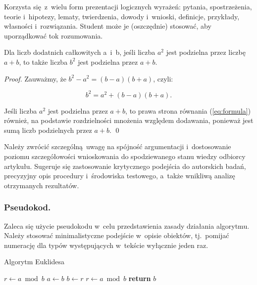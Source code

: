 Korzysta się z~wielu form prezentacji logicznych wyrażeń: pytania, spostrzeżenia, teorie i~hipotezy, lematy, twierdzenia, dowody i~wnioski, definicje, przykłady, własności i~rozwiązania. Student może je (oszczędnie) stosować, aby uporządkować tok rozumowania.

\begin{claim}
	Dla liczb dodatnich całkowitych a~i~b, jeśli liczba $a^{2}$ jest podzielna przez liczbę $a+b$, to także liczba $b^{2}$ jest podzielna przez $a+b$.
\end{claim}
\begin{proof}
	Zauważmy, że $b^{2} - a^{2} = (b-a)(b+a)$, czyli:

	\begin{equation} \label{eq:formula}
		b^{2} = a^{2} + (b-a)(b+a).
	\end{equation}

	\noindent Jeśli liczba $a^{2}$ jest podzielna przez $a+b$, to prawa strona równania (\ref{eq:formula}) również, na podstawie rozdzielności mnożenia względem dodawania, ponieważ jest sumą liczb podzielnych przez $a+b$. \qed
\end{proof}

Należy zwrócić szczególną uwagę na spójność argumentacji i~dostosowanie poziomu szczegółowości wnioskowania do spodziewanego stanu wiedzy odbiorcy artykułu. Sugeruje się zastosowanie krytycznego podejścia do autorskich badań, precyzyjny opis procedury i~środowiska testowego, a~także wnikliwą analizę otrzymanych rezultatów.

\subsubsection{Pseudokod.}
\label{subsubsec:pseudocode}

Zaleca się użycie pseudokodu w~celu przedstawienia zasady działania algorytmu. Należy stosować minimalistyczne podejście w~opisie obiektów, tj.~pomijać numerację dla typów występujących w~tekście wyłącznie jeden raz.

\vspace{-4mm}
\begin{algorithm}
	\renewcommand{\thealgorithm}{} %
	\caption{Algorytm Euklidesa} \label{alg:euclid}
	\begin{algorithmic}[1]
		 
			\State $r\gets a\bmod b$
			 
				\State $a\gets b$
				\State $b\gets r$
				\State $r\gets a\bmod b$
			\EndWhile \label{alg:euclid:endwhile}
			\State \textbf{return} $b$
		\EndProcedure
	\end{algorithmic}
\end{algorithm}
\vspace{-8mm}

